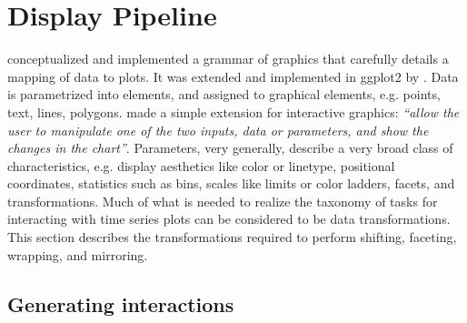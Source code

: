 \documentclass[12pt]{article}
\begin{document}
\section{Display Pipeline\label{sec:Pipeline}}

\citet{wilkinson2000language, wilkinson2001nvizn, wilkinson2006grammar}
conceptualized and implemented a grammar of graphics that
carefully details a mapping of data to plots. It was extended
and implemented in ggplot2 by \citet{ggplot2}. Data is
parametrized into elements, and assigned to graphical elements,
e.g. points, text, lines, polygons. \citet{wills2012visualizing}
made a simple extension for interactive graphics: \textit{``allow
the user to manipulate one of the two inputs, data or parameters,
and show the changes in the chart''}. Parameters, very generally,
describe a very broad class of characteristics, e.g. display
aesthetics like color or linetype, positional coordinates,
statistics such as bins, scales like limits or color ladders,
facets, and transformations. Much of what is needed to realize
the taxonomy of tasks for interacting with time series plots
can be considered to be data transformations. This section
describes the transformations required to perform shifting,
faceting, wrapping, and mirroring.



\subsection{Generating interactions\label{interaction-formulas}}
\end{document}
